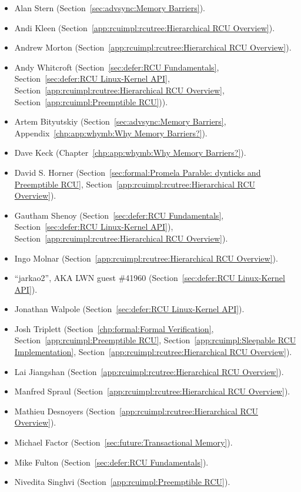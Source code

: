 \begin{itemize}
\item	Alan Stern (Section~\ref{sec:advsync:Memory Barriers}).
\item	Andi Kleen (Section~\ref{app:rcuimpl:rcutree:Hierarchical RCU Overview}).
\item	Andrew Morton (Section~\ref{app:rcuimpl:rcutree:Hierarchical RCU Overview}).
\item	Andy Whitcroft (Section~\ref{sec:defer:RCU Fundamentals},
	Section~\ref{sec:defer:RCU Linux-Kernel API},
	Section~\ref{app:rcuimpl:rcutree:Hierarchical RCU Overview},
	Section~\ref{app:rcuimpl:Preemptible RCU})).
\item	Artem Bityutskiy (Section~\ref{sec:advsync:Memory Barriers},
	Appendix~\ref{chp:app:whymb:Why Memory Barriers?}).
\item	Dave Keck (Chapter~\ref{chp:app:whymb:Why Memory Barriers?}).
\item	David S. Horner
	(Section~\ref{sec:formal:Promela Parable: dynticks and Preemptible RCU},
	Section~\ref{app:rcuimpl:rcutree:Hierarchical RCU Overview}).
\item	Gautham Shenoy (Section~\ref{sec:defer:RCU Fundamentals},
	Section~\ref{sec:defer:RCU Linux-Kernel API}),
	Section~\ref{app:rcuimpl:rcutree:Hierarchical RCU Overview}).
\item	Ingo Molnar (Section~\ref{app:rcuimpl:rcutree:Hierarchical RCU Overview}).
\item	``jarkao2'', AKA LWN guest \#41960 (Section~\ref{sec:defer:RCU Linux-Kernel API}).
\item	Jonathan Walpole (Section~\ref{sec:defer:RCU Linux-Kernel API}).
\item	Josh Triplett
	(Section~\ref{chp:formal:Formal Verification},
	Section~\ref{app:rcuimpl:Preemptible RCU},
	Section~\ref{app:rcuimpl:Sleepable RCU Implementation},
	Section~\ref{app:rcuimpl:rcutree:Hierarchical RCU Overview}).
\item	Lai Jiangshan (Section~\ref{app:rcuimpl:rcutree:Hierarchical RCU Overview}).
\item	Manfred Spraul (Section~\ref{app:rcuimpl:rcutree:Hierarchical RCU Overview}).
\item	Mathieu Desnoyers (Section~\ref{app:rcuimpl:rcutree:Hierarchical RCU Overview}).
\item	Michael Factor (Section~\ref{sec:future:Transactional Memory}).
\item	Mike Fulton (Section~\ref{sec:defer:RCU Fundamentals}).
\item	Nivedita Singhvi (Section~\ref{app:rcuimpl:Preemptible RCU}).

\end{itemize}
